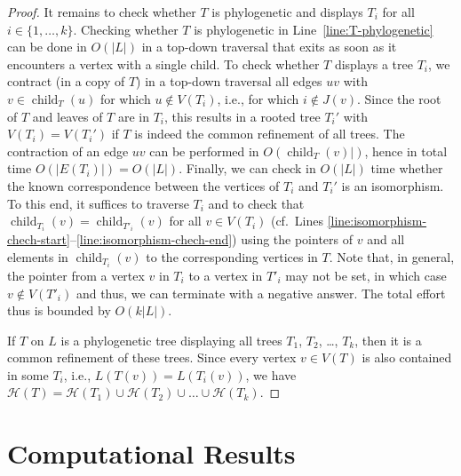 \documentclass[11pt]{article}
\newcommand{\child}{\operatorname{child}}
\newcommand{\HH}{\mathcal{H}}
\begin{document}
\begin{proof}
  It remains to check whether $T$ is phylogenetic and displays $T_i$ for
  all $i\in\{1,\dots,k\}$.  Checking whether $T$ is phylogenetic in
  Line~\ref{line:T-phylogenetic} can be done in $O(|L|)$ in a top-down
  traversal that exits as soon as it encounters a vertex with a single
  child. To check whether $T$ displays a tree $T_i$, we contract (in a copy
  of $T$) in a top-down traversal all edges $uv$ with $v\in \child_T(u)$
  for which $u\notin V(T_i)$, i.e., for which $i\notin J(v)$.  Since the
  root of $T$ and leaves of $T$ are in $T_i$, this results in a rooted tree
  $T_i'$ with $V(T_i)=V(T_i')$ if $T$ is indeed the common refinement of
  all trees. The contraction of an edge $uv$ can be performed in
  $O(\child_T(v)|)$, hence in total time $O(|E(T_i)|)=O(|L|)$. Finally, we
  can check in $O(|L|)$ time whether the known correspondence between the
  vertices of $T_i$ and $T_i'$ is an isomorphism. To this end, it suffices
  to traverse $T_i$ and to check that $\child_{T_i}(v)=\child_{T'_i}(v)$
  for all $v\in V(T_i)$ (cf.\ Lines
  \ref{line:isomorphism-chech-start}--\ref{line:isomorphism-chech-end})
  using the pointers of $v$ and all elements in $\child_{T_i}(v)$ to the
  corresponding vertices in $T$. Note that, in general, the pointer from a
  vertex $v$ in $T_i$ to a vertex in $T'_i$ may not be set, in which case
  $v\notin V(T'_i)$ and thus, we can terminate with a negative answer.  The
  total effort thus is bounded by $O(k|L|)$.
  
  If $T$ on $L$ is a phylogenetic tree displaying all trees $T_1$, $T_2$,
  \dots, $T_k$, then it is a common refinement of these trees.  Since every
  vertex $v\in V(T)$ is also contained in some $T_i$, i.e.,
  $L(T(v))=L(T_i(v))$, we have
  $\HH(T)=\HH(T_1)\cup\HH(T_2)\cup\dots\cup\HH(T_k)$.
\end{proof}

\section*{Computational Results} 
\end{document}
